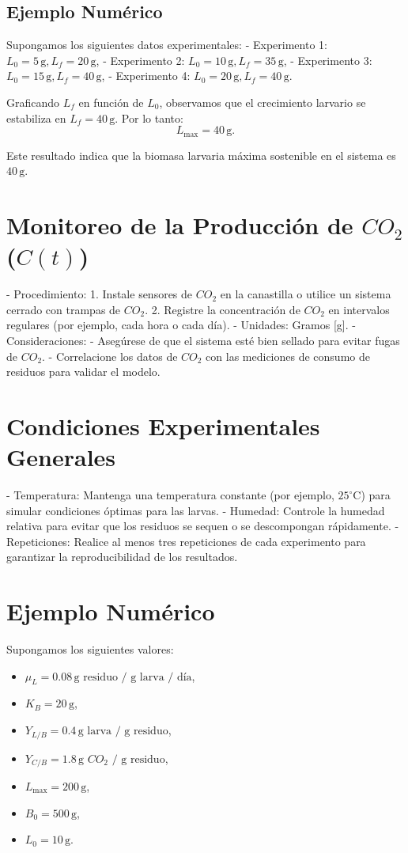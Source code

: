 \documentclass[12pt]{article}
\begin{document}
\subsection{Ejemplo Numérico}

Supongamos los siguientes datos experimentales:
- Experimento 1: $L_0 = 5 \, \text{g}, L_f = 20 \, \text{g}$,
- Experimento 2: $L_0 = 10 \, \text{g}, L_f = 35 \, \text{g}$,
- Experimento 3: $L_0 = 15 \, \text{g}, L_f = 40 \, \text{g}$,
- Experimento 4: $L_0 = 20 \, \text{g}, L_f = 40 \, \text{g}$.

Graficando $L_f$ en función de $L_0$, observamos que el crecimiento larvario se estabiliza en $L_f = 40 \, \text{g}$. Por lo tanto:
\[
L_{\text{max}} = 40 \, \text{g}.
\]

Este resultado indica que la biomasa larvaria máxima sostenible en el sistema es $40 \, \text{g}$.

\section{Monitoreo de la Producción de $CO_2$ ($C(t)$)}
- Procedimiento:
  1. Instale sensores de $CO_2$ en la canastilla o utilice un sistema cerrado con trampas de $CO_2$.
  2. Registre la concentración de $CO_2$ en intervalos regulares (por ejemplo, cada hora o cada día).
- Unidades: Gramos [g].
- Consideraciones:
  - Asegúrese de que el sistema esté bien sellado para evitar fugas de $CO_2$.
  - Correlacione los datos de $CO_2$ con las mediciones de consumo de residuos para validar el modelo.

\section{Condiciones Experimentales Generales}
- Temperatura: Mantenga una temperatura constante (por ejemplo, $25^\circ \text{C}$) para simular condiciones óptimas para las larvas.
- Humedad: Controle la humedad relativa para evitar que los residuos se sequen o se descompongan rápidamente.
- Repeticiones: Realice al menos tres repeticiones de cada experimento para garantizar la reproducibilidad de los resultados.
\section{Ejemplo Numérico}
Supongamos los siguientes valores:
\begin{itemize}
    \item $\mu_L = 0.08 \, \text{g residuo / g larva / día}$,
    \item $K_B = 20 \, \text{g}$,
    \item $Y_{L/B} = 0.4 \, \text{g larva / g residuo}$,
    \item $Y_{C/B} = 1.8 \, \text{g $CO_2$ / g residuo}$,
    \item $L_{\text{max}} = 200 \, \text{g}$,
    \item $B_0 = 500 \, \text{g}$,
    \item $L_0 = 10 \, \text{g}$.
\end{itemize}
\end{document}
